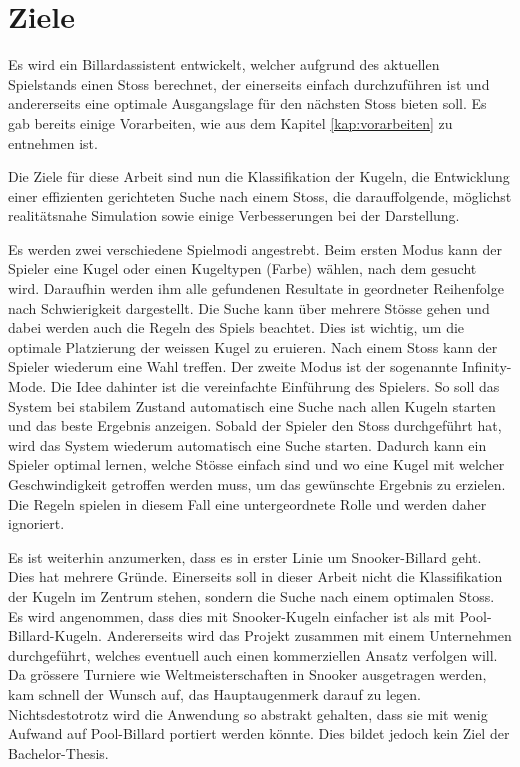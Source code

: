 \chapter{Ziele}\label{kap:ziele}
Es wird ein Billardassistent entwickelt, welcher aufgrund des aktuellen Spielstands einen Stoss berechnet, der einerseits
einfach durchzuführen ist und andererseits eine optimale Ausgangslage für den nächsten Stoss bieten soll. Es gab bereits
einige Vorarbeiten\cite{project2:ziele}, wie aus dem Kapitel \ref{kap:vorarbeiten} zu entnehmen ist.

Die Ziele für diese Arbeit sind nun die Klassifikation der Kugeln,
die Entwicklung einer effizienten gerichteten Suche nach einem Stoss, die darauffolgende,
möglichst realitätsnahe Simulation sowie einige Verbesserungen bei der Darstellung.

Es werden zwei verschiedene Spielmodi angestrebt. Beim ersten Modus kann der Spieler eine Kugel oder einen Kugeltypen (Farbe)
wählen, nach dem gesucht wird. Daraufhin werden ihm alle gefundenen Resultate in geordneter Reihenfolge nach Schwierigkeit
dargestellt. Die Suche kann über mehrere Stösse gehen und dabei werden auch die Regeln des Spiels beachtet. Dies ist wichtig,
um die optimale Platzierung der weissen Kugel zu eruieren. Nach einem Stoss kann der Spieler wiederum eine Wahl treffen.
Der zweite Modus ist der sogenannte \glqq Infinity-Mode\grqq. Die Idee dahinter ist die vereinfachte Einführung des Spielers.
So soll das System bei stabilem Zustand automatisch eine Suche nach allen Kugeln starten und das beste Ergebnis
anzeigen. Sobald der Spieler den Stoss durchgeführt hat, wird das System wiederum automatisch eine Suche starten.
Dadurch kann ein Spieler optimal lernen, welche Stösse einfach sind und wo eine Kugel mit welcher Geschwindigkeit
getroffen werden muss, um das gewünschte Ergebnis zu erzielen. Die Regeln spielen in diesem Fall eine untergeordnete
Rolle und werden daher ignoriert.

Es ist weiterhin anzumerken, dass es in erster Linie um Snooker-Billard geht. Dies hat mehrere Gründe. Einerseits soll
in dieser Arbeit nicht die Klassifikation der Kugeln im Zentrum stehen, sondern die Suche nach einem optimalen Stoss.
Es wird angenommen, dass dies mit Snooker-Kugeln einfacher ist als mit Pool-Billard-Kugeln. Andererseits wird das
Projekt zusammen mit einem Unternehmen durchgeführt, welches eventuell auch einen kommerziellen Ansatz verfolgen
will. Da grössere Turniere wie Weltmeisterschaften in Snooker ausgetragen werden, kam schnell der Wunsch auf, das
Hauptaugenmerk darauf zu legen. Nichtsdestotrotz wird die Anwendung so abstrakt gehalten, dass sie mit wenig Aufwand
auf Pool-Billard portiert werden könnte. Dies bildet jedoch kein Ziel der Bachelor-Thesis.

